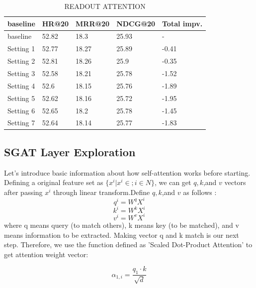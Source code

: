 \documentclass{article}
\begin{document}
\begin{table}
    \caption{READOUT ATTENTION}
    \label{tab:set_{result}}
    \centering
    \begin{tabular}{lllll}
        \toprule
        baseline  & HR@20 & MRR@20 & NDCG@20 & Total impv. \\
        \midrule
        baseline  & 52.82 & 18.3   & 25.93   & -           \\
        Setting 1 & 52.77 & 18.27  & 25.89   & -0.41       \\
        Setting 2 & 52.81 & 18.26  & 25.9    & -0.35       \\
        Setting 3 & 52.58 & 18.21  & 25.78   & -1.52       \\
        Setting 4 & 52.6  & 18.15  & 25.76   & -1.89       \\
        Setting 5 & 52.62 & 18.16  & 25.72   & -1.95       \\
        Setting 6 & 52.65 & 18.2   & 25.78   & -1.45       \\
        Setting 7 & 52.64 & 18.14  & 25.77   & -1.83       \\
        \bottomrule
    \end{tabular}
\end{table}

\subsection{SGAT Layer Exploration}
Let's introduce basic information about
how self-attention works before starting.
Defining a original feature set as $\{x^i | x^i \in ; i \in N \}$,
we can get $q, k$,and $ v$ vectors after passing $x^i$ through
linear transform.Define $q, k$,and $v$ as follows :
\begin{equation} q^i = W^qX^i \end{equation}
\begin{equation} k^i = W^kX^i \end{equation}
\begin{equation} v^i = W^vX^i  \end{equation}
where q means query (to match others), k means key (to be matched),
and v means information to be extracted.
Making vector q and k match is our next step. Therefore,
we use the function defined as 'Scaled Dot-Product Attention'
to get attention weight vector:

\begin{equation}
    \alpha_{1,i} = \frac{q_1 \cdot k}{\sqrt{d}}
\end{equation}
\end{document}
